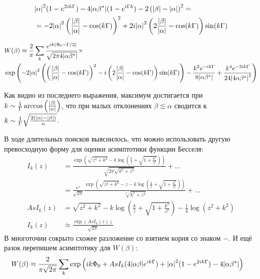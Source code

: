 \documentclass[a4paper, 12pt]{article}
\newenvironment{eqw}{\begin{equation} \begin{aligned}}   
    {\end{aligned}    \end{equation}}
\begin{document}
\begin{eqw}
    &\abs{\alpha}^2 (1-e^{2ik\Gamma})-4\abs{\alpha\beta^*}(1-e^{i\Gamma k})-2\left(\abs{\beta} - \abs{\alpha}\right)^2 =\\ 
    &= -2\abs{\alpha}^2 \left(\frac{\abs{\beta}}{\abs{\alpha}}-\cos(k\Gamma)\right)^2+2i\abs{\alpha}^2
    \left(2\frac{\abs{\beta}}{\abs{\alpha}} - \cos(k\Gamma)\right)\sin(k\Gamma)
\end{eqw}

\begin{eqw}
    &W(\beta) \approx \frac{2}{\pi}
    \sum\limits_k \frac{e^{ik(\Phi_0-\Gamma/2)}}{\sqrt{2\pi 4\abs{\alpha\beta^*}}}\times\\
    &\exp\left(-2\abs{\alpha}^2 \left(\left(\frac{\abs{\beta}}{\abs{\alpha}}-\cos(k\Gamma)\right)^2-i
    \left(2\frac{\abs{\beta}}{\abs{\alpha}} - \cos(k\Gamma)\right)\sin(k\Gamma)\right) -
    \frac{k^2 e^{-ik\Gamma}}{8\abs{\alpha\beta^*}}+\frac{k^4 e^{-3ik\Gamma}}{24\abs{4\alpha\beta^*}^3}\right)
\end{eqw}

Как видно из последнего выражения, максимум достигается при $k\sim\frac{1}{\Gamma}\arccos\left(\frac{\abs{\beta}}{\abs{\alpha}}\right)$, что при малых отклонениях $\beta\lesssim\alpha$ сводится к $k\sim\frac{1}{\Gamma}\sqrt{\frac{2(\abs{\alpha}-\abs{\beta})}{\alpha}}$. 

В ходе длительных поисков выяснилось, что можно использовать другую превосходную форму для оценки асимптотики функции Бесселя:
\begin{eqw}
     I_k(z) &= \frac{\exp\left(\sqrt{z^2+k^2}-k\log\left(\frac{k}{z}+\sqrt{1+\frac{k^2}{z^2}}\right)\right)}{\sqrt{2\pi\sqrt{k^2+z^2}}}+...\\
    &= \frac{e^z}{\sqrt{2\pi}}\frac{\exp\left(\sqrt{z^2+k^2}-z-k\log\left(\frac{k}{z}+\sqrt{1+\frac{k^2}{z^2}}\right)\right)}{\sqrt[4]{k^2+z^2}}+\dots\\
    AsI_k(z) &= \sqrt{z^2+k^2}-k\log\left(\frac{k}{z}+\sqrt{1+\frac{k^2}{z^2}}\right) - \frac{1}{4}\log\left(z^2+k^2\right)\\
    I_k(z) &\approx \frac{\exp\left(AsI_k(z)\right)}{\sqrt{2\pi}}
\end{eqw}
В многоточии сокрыто схожее разложение со взятием корня со знаком $-$. И ещё разок перепишем асимптотику для $W(\beta)$:
\begin{eqw}
    &W(\beta) \approx \frac{2}{\pi\sqrt{2\pi}}
    \sum\limits_k \exp\left(ik\Phi_0+AsI_k(4\abs{\alpha\beta}e^{ik\Gamma})+\abs{\alpha}^2 (1-e^{2ik\Gamma})-4\abs{\alpha\beta^*}\right)
\end{eqw}
\end{document}
